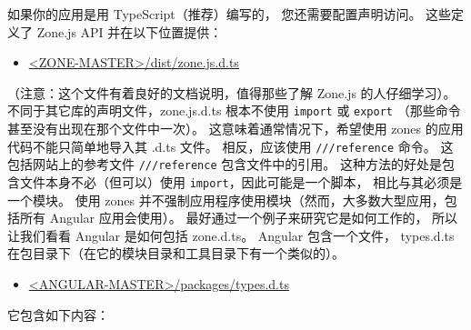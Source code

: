 


如果你的应用是用 TypeScript（推荐）编写的，
您还需要配置声明访问。 这些定义了 Zone.js API 并在以下位置提供：

\begin{itemize}
  \item \href{https://github.com/angular/zone.js/blob/master/dist/zone.js.d.ts}
        {<ZONE-MASTER>/dist/zone.js.d.ts}
\end{itemize}


（注意：这个文件有着良好的文档说明，值得那些了解 Zone.js 的人仔细学习）。
不同于其它库的声明文件，zone.js.d.ts 根本不使用 \texttt{import} 或 \texttt{export}
（那些命令甚至没有出现在那个文件中一次）。
这意味着通常情况下，希望使用 zones 的应用代码不能只简单地导入其 .d.ts 文件。
相反，应该使用 \texttt{///reference} 命令。
这包括网站上的参考文件 \texttt{///reference} 包含文件中的引用。
这种方法的好处是包含文件本身不必（但可以）使用 \texttt{import}，因此可能是一个脚本，
相比与其必须是一个模块。
使用 zones 并不强制应用程序使用模块（然而，大多数大型应用，包括所有 Angular 应用会使用）。
最好通过一个例子来研究它是如何工作的，
所以让我们看看 Angular 是如何包括 zone.d.ts。 Angular 包含一个文件，
types.d.ts 在包目录下（在它的模块目录和工具目录下有一个类似的）。

\begin{itemize}
  \item \href{https://github.com/angular/angular/blob/master/modules/types.d.ts}
        {<ANGULAR-MASTER>/packages/types.d.ts}
\end{itemize}


它包含如下内容：




